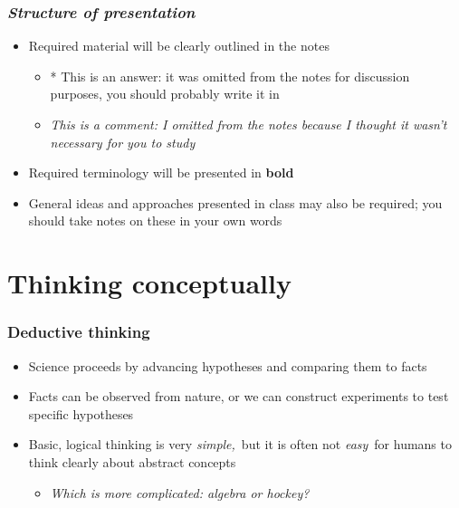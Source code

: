 \documentclass{beamer}
\begin{document}
\begin{frame}


\frametitle{{\sl Structure of presentation}}\begin{itemize}

\item Required material will be clearly outlined in the notes\begin{itemize}

\item * {\color{blue} This is an answer: it was omitted from the notes for
		discussion purposes, you should probably write it in}

\item {\color{green}\sl This is a comment: I omitted from the notes because I
		thought it wasn't necessary for you to study}\end{itemize}

\item Required terminology will be presented in {\bf bold}

\item General ideas and approaches presented in class may also be required;
	you should take notes on these in your own words\end{itemize}
\end{frame}


 \section{Thinking conceptually}
\begin{frame}


\frametitle{Deductive thinking}\begin{itemize}

\item Science proceeds by advancing hypotheses and comparing them to facts

\item Facts can be observed from nature, or we can construct experiments
	to test specific hypotheses

\item Basic, logical thinking is very {\em simple,\,} but it is often not {\em easy\,} for
	humans to think clearly about abstract concepts\begin{itemize}

\item {\color{green}\sl Which is more complicated: algebra or hockey?}\end{itemize}\end{itemize}
\end{frame}
\end{document}
